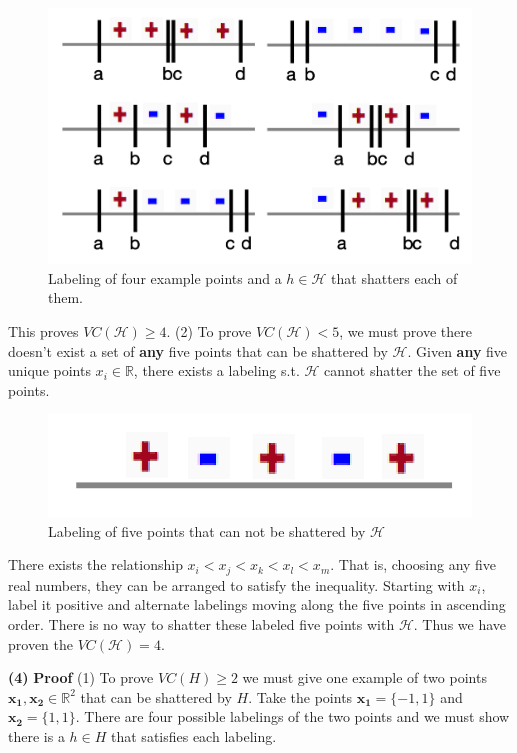 \documentclass[11pt]{article}
\renewcommand\part[1]{\vspace{.10in}\textbf{(#1)}}
\begin{document}
\begin{figure}[H]
  \centerline{\includegraphics[width=0.5\linewidth]{image_2_3_1.png}}
  \caption{Labeling of four example points and a $h \in \mathcal{H}$ that shatters each of them.}
\end{figure}

This proves $VC(\mathcal{H}) \geq 4$. (2) To prove $VC(\mathcal{H}) < 5$, we must prove there doesn't exist a set of \textbf{any} five points that can be shattered by $\mathcal{H}$. Given \textbf{any} five unique points $x_i \in \mathbb{R}$, there exists a labeling s.t. $\mathcal{H}$ cannot shatter the set of five points.

\begin{figure}[H]
  \centerline{\includegraphics[width=0.5\linewidth]{image_2_3_2.png}}
  \caption{Labeling of five points that can not be shattered by $\mathcal{H}$}
\end{figure}

There exists the relationship $x_i < x_j < x_k < x_l < x_m$. That is, choosing any five real numbers, they can be arranged to satisfy the inequality. Starting with $x_i$, label it positive and alternate labelings moving along the five points in ascending order. There is no way to shatter these labeled five points with $\mathcal{H}$. Thus we have proven the $VC(\mathcal{H}) = 4$.


\part{4} \textbf{Proof} (1) To prove $VC(H) \geq 2$ we must give one example of two points $\mathbf{x_1}, \mathbf{x_2} \in \mathbb{R}^2$ that can be shattered by $H$. Take the points $\mathbf{x_1} = \{-1, 1\}$ and $\mathbf{x_2} = \{1, 1\}$. There are four possible labelings of the two points and we must show there is a $h \in H$ that satisfies each labeling.
\end{document}
